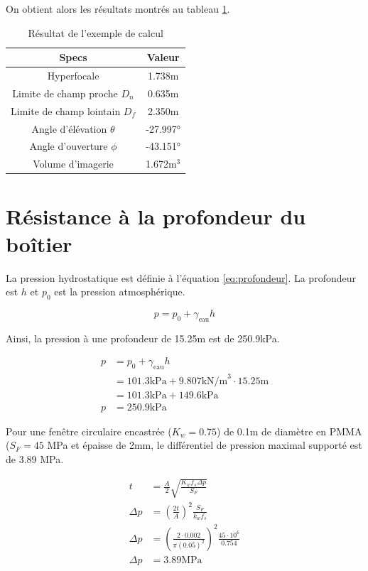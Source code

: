 On obtient alors les résultats montrés au tableau \ref{t:resultat_calcul_camera_custom}.
\begin{table}[!htb]
\footnotesize
\centering
    \begin{tabular}{|c|c|}
    \hline
    Specs & Valeur\\
    \hline\hline
    Hyperfocale & 1.738m\\
    Limite de champ proche $D_n$ & 0.635m\\
    Limite de champ lointain $D_f$ & 2.350m\\
    Angle d'élévation $\theta$ & -27.997°\\
    Angle d'ouverture $\phi$ & -43.151°\\
    Volume d'imagerie & 1.672m$^3$\\
    \hline
    \end{tabular}
\caption{Résultat de l'exemple de calcul}
\label{t:resultat_calcul_camera_custom}
\end{table}


\section{Résistance à la profondeur du boîtier}
\label{annexe:equation_boitier}

La pression hydrostatique est définie à l'équation \ref{eq:profondeur}. La profondeur est $h$ et $p_0$ est la pression atmosphérique.

\begin{equation}
    p = p_0 +\gamma_\text{eau} h
    \label{eq:profondeur}
\end{equation}

Ainsi, la pression à une profondeur de 15.25m est de 250.9kPa.

\begin{align}
    p &= p_0 +\gamma_\text{eau} h\\
    &= 101.3\text{kPa} + 9.807\text{kN/m}^3 \cdot 15.25\text{m}\\
    &= 101.3\text{kPa} + 149.6\text{kPa}\\
    p &= 250.9\text{kPa}
\end{align}

Pour une fenêtre circulaire encastrée ($K_w=0.75$) de 0.1m de diamètre en PMMA ($S_F=45$ MPa et épaisse de 2mm, le différentiel de pression maximal supporté est de 3.89 MPa.

\begin{align*}
    t &= \frac{A}{2} \sqrt{\frac{K_w f_s \Delta p}{S_F}}\\
    \Delta p &= \left( \frac{2t}{A}\right)^2 \frac{S_F}{k_w f_s}\\
    \Delta p &= \left( \frac{2\cdot 0.002}{\pi (0.05)^2}\right)^2 \frac{45\cdot10^6}{0.75 4}\\
    \Delta p &= 3.89 \text{MPa}
    \label{annexe:eq_resistance}
\end{align*}

